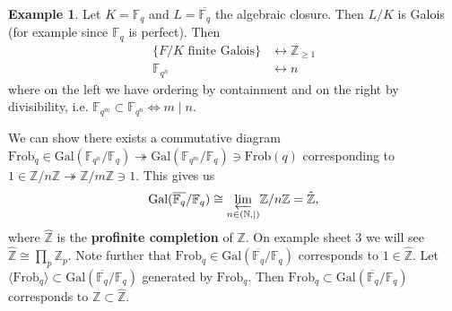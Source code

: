 \documentclass{article}
\theoremstyle{definition}
\newtheorem{example}{Example}[section]
\begin{document}
\begin{example}
    Let $K = \mathbb{F}_q$ and $L = \overline{\mathbb{F}_q}$ the algebraic closure. Then $L/K$ is Galois (for example since $\mathbb{F}_q$ is perfect). Then 
    \begin{align*}
        \{F/K \text{ finite Galois}\} &\leftrightarrow \mathbb{Z}_{\ge 1}\\
        \mathbb{F}_{q^n} &\leftrightarrow n
    \end{align*}
    where on the left we have ordering by containment and on the right by divisibility, i.e. $\mathbb{F}_{q^m} \subset \mathbb{F}_{q^n} \iff m \mid n$.
    
    We can show there exists a commutative diagram $\text{Frob}_q \in \text{Gal}(\mathbb{F}_{q^n}/\mathbb{F}_q) \twoheadrightarrow \text{Gal}(\mathbb{F}_{q^m}/\mathbb{F}_q) \ni \text{Frob}(q)$ corresponding to $1 \in\mathbb{Z}/n\mathbb{Z} \twoheadrightarrow \mathbb{Z}/m\mathbb{Z} \ni 1$.
    This gives us \begin{align*}
        \text{Gal}(\overline{\mathbb{F}_q}/\mathbb{F}_q) \cong \underset{n \in (\mathbb{N}, \mid )}{\varprojlim} \mathbb{Z}/n\mathbb{Z} = \hat{\mathbb{Z}},
    \end{align*}
    where $\hat{\mathbb{Z}}$ is the \textbf{profinite completion} of $\mathbb{Z}$. On example sheet 3 we will see $\hat{\mathbb{Z}} \cong \prod_{p}^{} \mathbb{Z}_p$. Note further that $\text{Frob}_q \in \text{Gal}(\overline{\mathbb{F}_q}/\mathbb{F}_q)$ corresponds to $1 \in \hat{\mathbb{Z}}$. Let $\langle \text{Frob}_q \rangle \subset \text{Gal}(\overline{\mathbb{F}_q}/\mathbb{F}_q)$ generated by $\text{Frob}_q$. Then $ \text{Frob}_q \subset \text{Gal}(\overline{\mathbb{F}_q}/\mathbb{F}_q)$ corresponds to $\mathbb{Z} \subset \hat{\mathbb{Z}}$.
\end{example}
\end{document}
